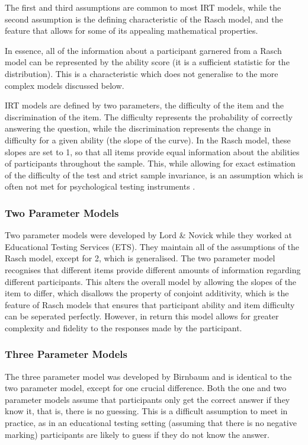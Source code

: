 The first and third assumptions are common to most IRT models, while the second assumption is the defining characteristic of the Rasch model, and the feature that allows for some of its appealing mathematical properties. 

In essence, all of the information about a participant garnered from a Rasch model can be represented by the ability score (it is a sufficient statistic for the distribution)\cite{fischer1995rasch}. This is a characteristic which does not generalise to the more complex models discussed below. 

IRT models are defined by two parameters, the difficulty of the item and the discrimination of the item. The difficulty represents the probability of correctly answering the question, while the discrimination represents the change in difficulty for a given ability (the slope of the curve). In the Rasch model, these slopes are set to 1, so that all items provide equal information about the abilities of participants throughout the sample. This, while allowing for exact estimation of the difficulty of the test and strict sample invariance, is an assumption which is often not met for psychological testing instruments \cite{embretson2000item}. 

\subsubsection{Two Parameter Models}

Two parameter models were developed by Lord \& Novick while they worked at Educational Testing Services (ETS)\cite{van1997handbook}. They maintain all of the assumptions of the Rasch model, except for 2, which is generalised. The two parameter model recognises that different items provide different amounts of information regarding different participants. This alters the overall model by allowing the slopes of the item to differ, which disallows the property of conjoint additivity, which is the feature of Rasch models that ensures that participant ability and item difficulty can be seperated perfectly. However, in return this model allows for greater complexity and fidelity to the responses made by the participant. 

\subsubsection{Three Parameter Models}

The three parameter model was developed by Birnbaum and is identical to the two parameter model, except for one crucial difference\cite{van1997handbook}. Both the one and two parameter models assume that participants only get the correct answer if they know it, that is, there is no guessing. This is a difficult assumption to meet in practice, as in an educational testing setting (assuming that there is no negative marking) participants are likely to guess if they do not know the answer.

